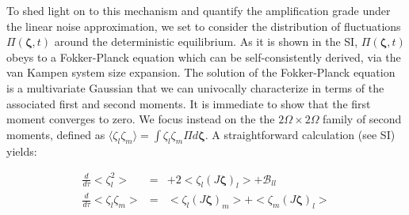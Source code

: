 \documentclass[showpacs,prl,superscriptaddress,nofootinbib, twocolumn]{revtex4}
\begin{document}
To shed light on to this mechanism and quantify the amplification grade under the linear noise approximation, we set to consider the distribution of fluctuations $\Pi({\boldsymbol \zeta},t)$  around the deterministic equilibrium. As it is shown in the SI, $\Pi({\boldsymbol \zeta},t)$ obeys to a Fokker-Planck equation which can be self-consistently derived, via the van Kampen system size expansion. The solution of the Fokker-Planck equation  is a multivariate Gaussian that we can univocally characterize in terms of the associated first and second moments. It is immediate to show that the first moment converges to zero. We focus instead on the 
the $2 \Omega \times 2 \Omega$ family of second moments, defined as $\langle \zeta_l \zeta_m \rangle = \int \zeta_l \zeta_m \Pi d {\boldsymbol \zeta}$. A straightforward calculation (see SI) yields:

\begin{eqnarray}
\label{moments}
\frac{d}{d\tau}<\zeta^2_l>&=&+2<\zeta_l(J{\boldsymbol \zeta})_l>+{\mathcal B}_{ll} \\
\frac{d}{d\tau}<\zeta_l\zeta_m>&=&<\zeta_l(J{\boldsymbol \zeta})_m>+<\zeta_m(J{\boldsymbol \zeta})_l> \nonumber
\end{eqnarray}
\end{document}
